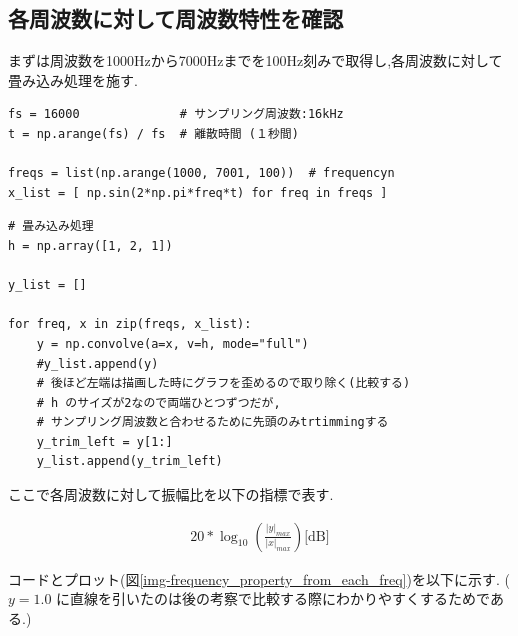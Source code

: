 \documentclass[12pt]{jsarticle}
\begin{document}
      \subsection{各周波数に対して周波数特性を確認} \label{各周波数に対して周波数特性を確認}
        まずは周波数を1000Hzから7000Hzまでを100Hz刻みで取得し,各周波数に対して畳み込み処理を施す.
        \begin{lstlisting}[basicstyle=\ttfamily\footnotesize, frame=single]
fs = 16000              # サンプリング周波数:16kHz
t = np.arange(fs) / fs  # 離散時間 (１秒間)

freqs = list(np.arange(1000, 7001, 100))  # frequencyn
x_list = [ np.sin(2*np.pi*freq*t) for freq in freqs ]
				\end{lstlisting}

        \begin{lstlisting}[basicstyle=\ttfamily\footnotesize, frame=single]
# 畳み込み処理
h = np.array([1, 2, 1])

y_list = []

for freq, x in zip(freqs, x_list):
    y = np.convolve(a=x, v=h, mode="full")
    #y_list.append(y)
    # 後ほど左端は描画した時にグラフを歪めるので取り除く(比較する)
    # h のサイズが2なので両端ひとつずつだが,
    # サンプリング周波数と合わせるために先頭のみtrtimmingする
    y_trim_left = y[1:]
    y_list.append(y_trim_left)
				\end{lstlisting}
				
				ここで各周波数に対して振幅比を以下の指標で表す.
				
				\begin{align*}
				  20 * \log_{10}\left(\frac{|y|_{max}}{|x|_{max}}\right) \text{[dB]}
				\end{align*}
				
				コードとプロット(図\ref{img-frequency_property_from_each_freq})を以下に示す.
				( $y=1.0$ に直線を引いたのは後の考察で比較する際にわかりやすくするためである.)
				
\end{document}
